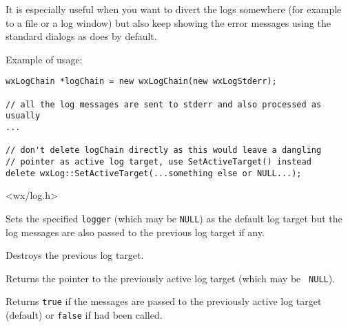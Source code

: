It is especially useful when you want to divert the logs somewhere (for
example to a file or a log window) but also keep showing the error messages
using the standard dialogs as  does by default.

Example of usage:

\begin{verbatim}
wxLogChain *logChain = new wxLogChain(new wxLogStderr);

// all the log messages are sent to stderr and also processed as usually
...

// don't delete logChain directly as this would leave a dangling
// pointer as active log target, use SetActiveTarget() instead
delete wxLog::SetActiveTarget(...something else or NULL...);

\end{verbatim}




<wx/log.h>


\label{wxlogchainctor}


Sets the specified {\tt logger} (which may be {\tt NULL}) as the default log
target but the log messages are also passed to the previous log target if any.

\label{wxlogchaindtor}


Destroys the previous log target.

\label{wxlogchaingetoldlog}


Returns the pointer to the previously active log target (which may be {\tt
NULL}).

\label{wxlogchainispassingmessages}


Returns {\tt true} if the messages are passed to the previously active log
target (default) or {\tt false} if 
had been called.

